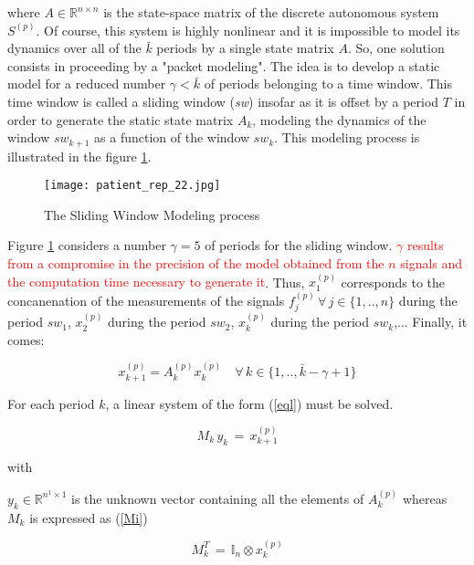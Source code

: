 \documentclass[letterpaper, 10 pt, conference]{ieeeconf}  %
\newcommand{\mI}{{\mathbb I}}
\newcommand{\mR}{{\mathbb R}}
\begin{document}
where $A\in \mR^{n \times n}$ is the state-space matrix of the discrete autonomous system $\textit{S}^{(p)}$. Of course, this system is highly nonlinear and it is impossible to model its dynamics over all of the $\bar{k}$ periods by a single state matrix $A$. So, one solution consists in proceeding by a "packet modeling". The idea is to develop a static model for a reduced number $\gamma<\bar{k}$ of periods belonging to a time window. This time window is called a sliding window (\textit{sw}) insofar as it is offset by a period $T$ in order to generate the static state matrix $A_k$, modeling the dynamics of the window $sw_{k+1}$ as a function of the window $sw_{k}$. This modeling process is illustrated in the figure \ref{sw}.

\begin{figure}[h]
	\begin{center}
		\texttt{[image: patient\_rep\_22.jpg]}
		\caption{The Sliding Window Modeling process} 
		\label{sw}
	\end{center}
\end{figure}

Figure \ref{sw} considers a number $\gamma=5$ of periods for the sliding window. \textcolor{red}{$\gamma$ results from a compromise in the precision of the model obtained from the $n$ signals and the computation time necessary to generate it}. Thus, $x_{1}^{(p)}$ corresponds to the concanenation of the measurements of the signals $f_j^{(p)} \, \forall \, j\in \{1,..,n\}$ during the period $sw_1$, $x_{2}^{(p)}$ during the period $sw_2$, $x_{k}^{(p)}$ during the period $sw_k$,... Finally, it comes:

\begin{equation}
\label{eq:sssw1}
x_{k+1}^{(p)}=A_k^{(p)}x_{k}^{(p)}\quad \forall \, k\in \{1,..,\bar{k}-\gamma+1\}
\end{equation}

For each period $k$, a linear system of the form (\ref{eql}) must be solved. 

\begin{equation}
		\label{eql}
		M_k\,y_k\,=\,x_{k+1}^{(p)}
		 \end{equation}
		 
		 with 
		 
		 $y_k \in \mR^{n^1 \times 1}$ is the unknown vector containing all the elements of $A_k^{(p)}$ whereas $M_k$ is expressed as (\ref{Mi})
		 
		 \begin{equation}
		\label{Mi}
		M_k^T\,=\,\mI_n \otimes x_{k}^{(p)}
		 \end{equation}
		 
\end{document}

